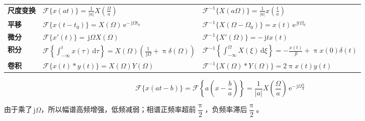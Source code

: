 \documentclass[UTF8,fontset=fandol,zihao=5]{ctexart}
\newcommand{\jj}{\,\mathrm{j}}
\newcommand{\ee}{\,\mathrm{e}}
\newcommand{\dd}{\,\mathrm{d}}
\newcommand{\FF}{\mathcal{F}}
\begin{document}
\begin{enumerate}
\begin{center}
\begin{tabularx}{0.98\textwidth}{>{\bfseries}p{1.5cm}X X}
    尺度变换
    &
    $\displaystyle
    \FF \{ x(at) \}
    =
    \frac{1}{|a|}
    X\left(\frac{\varOmega}{a}\right)
    $
    &
    $\displaystyle
    \FF^{-1} \{ X(a\varOmega) \}
    =
    \frac{1}{|a|}
    x\left(\frac{t}{a}\right)
    $
    \\

    平移
    &
    $\displaystyle
    \FF \{ x(t-t_0) \}
    =
    X(\varOmega)\ee^{-\jj \varOmega t_0}
    $
    &
    $\displaystyle
    \FF^{-1} \{ X(\varOmega-\varOmega_0) \}
    =
    x(t)\ee^{\jj t\varOmega_0}
    $
    \\

    微分
    &
    $\displaystyle
    \FF \{ x'(t) \}
    =
    \jj \varOmega X(\varOmega)
    $


    &
    $\displaystyle
    \FF^{-1} \{ X'(\varOmega) \}
    =
    -\jj t x(t)
    $
    \\

    积分
    &
    $\displaystyle
    \FF
    \left\{
    \int_{-\infty}^{t} x(\tau)\dd\tau
    \right\}
    =
    X(\varOmega)
    \left(
    \frac{1}{\jj\varOmega}
    +
    \uppi\delta(\varOmega)
    \right)
    $
    &
    $\displaystyle
    \FF^{-1}
    \left\{
    \int_{-\infty}^{\varOmega} X(\xi)\dd\xi
    \right\}
    =
    -\frac{x(t)}{\jj t}
    +
    \uppi x(0)\delta(t)
    $
    \\

    卷积
    &
    $\displaystyle
    \FF \{ x(t)\ast y(t) \}
    =
    X(\varOmega)Y(\varOmega)
    $
    &
    $\displaystyle
    \FF^{-1}
    \{ X(\varOmega)\ast Y(\varOmega) \}
    =
    2\uppi x(t)y(t)
    $
    \\

    \bottomrule
    \end{tabularx}
    \end{center}

\end{enumerate}

\begin{methodbox}[【技巧】时移与尺度变换对应]
  \[
  \FF \{x(at-b)\}=\FF \left\{a \left( x - \frac{b}{a} \right)\right\} = \frac{1}{|a|} X \left( \frac{\varOmega}{a} \right) \ee^{-\jj \varOmega \frac{b}{a}}
  \]
\end{methodbox}


\begin{methodbox}[【理解】微分的实际意义]
  由于乘了$\jj \varOmega$，所以幅谱高频增强，低频减弱；相谱正频率超前$\dfrac{\uppi}{2}$，负频率滞后$\dfrac{\uppi}{2}$。
\end{methodbox}
\end{document}
